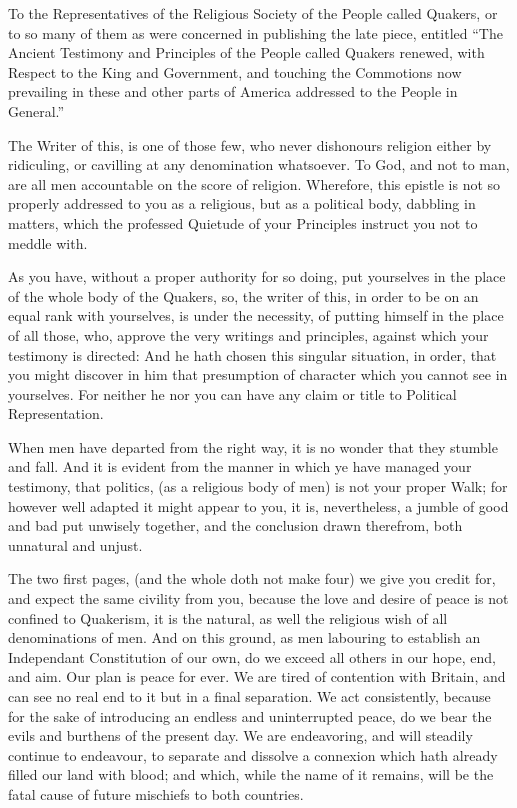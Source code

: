 \documentclass[12pt,oneside]{memoir}
\begin{document}
To the Representatives of the Religious Society of the People called Quakers, or to so many of them as were concerned in publishing the late piece, entitled ``The Ancient Testimony and Principles of the People called Quakers renewed, with Respect to the King and Government, and touching the Commotions now prevailing in these and other parts of America addressed to the People in General.''

The Writer of this, is one of those few, who never dishonours religion either by ridiculing, or cavilling at any denomination whatsoever. To God, and not to man, are all men accountable on the score of religion. Wherefore, this epistle is not so properly addressed to you as a religious, but as a political body, dabbling in matters, which the professed Quietude of your Principles instruct you not to meddle with.

As you have, without a proper authority for so doing, put yourselves in the place of the whole body of the Quakers, so, the writer of this, in order to be on an equal rank with yourselves, is under the necessity, of putting himself in the place of all those, who, approve the very writings and principles, against which your testimony is directed: And he hath chosen this singular situation, in order, that you might discover in him that presumption of character which you cannot see in yourselves. For neither he nor you can have any claim or title to Political Representation.

When men have departed from the right way, it is no wonder that they stumble and fall. And it is evident from the manner in which ye have managed your testimony, that politics, (as a religious body of men) is not your proper Walk; for however well adapted it might appear to you, it is, nevertheless, a jumble of good and bad put unwisely together, and the conclusion drawn therefrom, both unnatural and unjust.

The two first pages, (and the whole doth not make four) we give you credit for, and expect the same civility from you, because the love and desire of peace is not confined to Quakerism, it is the natural, as well the religious wish of all denominations of men. And on this ground, as men labouring to establish an Independant Constitution of our own, do we exceed all others in our hope, end, and aim. Our plan is peace for ever. We are tired of contention with Britain, and can see no real end to it but in a final separation. We act consistently, because for the sake of introducing an endless and uninterrupted peace, do we bear the evils and burthens of the present day. We are endeavoring, and will steadily continue to endeavour, to separate and dissolve a connexion which hath already filled our land with blood; and which, while the name of it remains, will be the fatal cause of future mischiefs to both countries.
\end{document}
